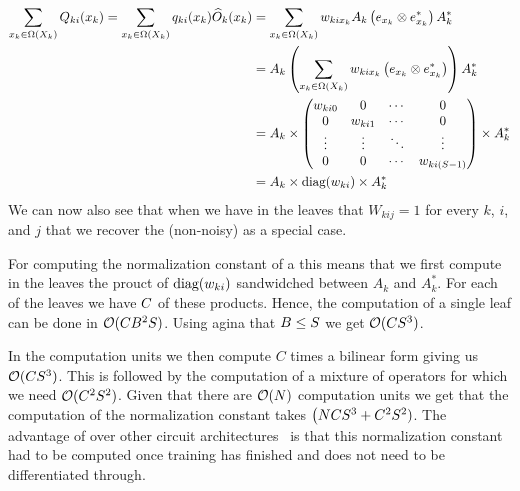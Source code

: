 \begin{align}
	\sum_{x_k \in \Omega(X_k)}Q_{ki}(x_k)
	=
	\sum_{x_k \in \Omega(X_k)} q_{ki}(x_k) \widehat{O}_k(x_k)
	 & =
	\sum_{x_k \in \Omega(X_k) }w_{ki x_k} A_k \left( e_{x_k} \otimes e_{x_k}^* \right)A_k^*
	\nonumber
	\\
	 & =
	A_k \left( \sum_{x_k \in \Omega(X_k) }w_{ki x_k}  \left( e_{x_k} \otimes e_{x_k}^* \right) \right) A_k^*
	\nonumber
	\\
	 & =
	A_k \times
	\begin{pmatrix}
		w_{ki0} & 0       & \cdots & 0                          \\
		0       & w_{ki1} & \cdots & 0                          \\
		\vdots  & \vdots  & \ddots & \vdots                     \\
		0       & 0       & \cdots & w_{ki(S-1)} \\
	\end{pmatrix}
	\times  A_k^*
	\nonumber
	\\
	 & =
	A_k \times  \text{diag}(w_{ki}) \times  A_k^*
\end{align}
We can now also see that when we have in the leaves that $W_{kij}=1$ for every $k$, $i$, and $j$ that we recover the (non-noisy) \puncs as a special case.

For computing the normalization constant of a \noisepunc this means that we first compute in the leaves the prouct of $ \text{diag}(w_{ki})$ sandwidched between $A_k$ and $A_k^*$. For each of the leaves we have $C$ of these products. Hence, the computation of a single leaf can be done in $\mathcal{O} (C B^2 S)$. Using agina that $B\leq S$ we get $\mathcal{O} (C S^3)$.

In the computation units we then compute $C$ times a bilinear form giving us $\mathcal{O}(C S^3)$. This is followed by the computation of a mixture of operators for which we need $ \mathcal{O}(C^2 S^2)$.
Given that there are $\mathcal{O}(N)$ computation units we get that the computation of the normalization constant takes $\big(N C S^3 + C^2 S^2)$. The advantage of \noisepuncs over other circuit architectures~\cite{loconte2024sum,wangrelationship} is that this normalization constant had to be computed once training has finished and does not need to be differentiated through.

